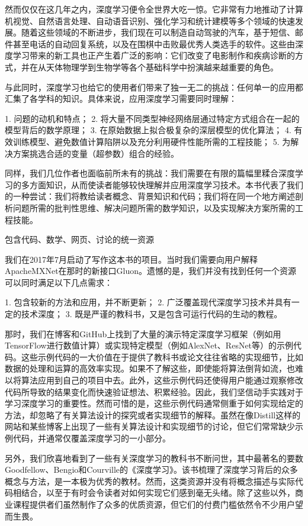 然而仅仅在这几年之内，深度学习便令全世界大吃一惊。它非常有力地推动了计算机视觉、自然语言处理、自动语音识别、强化学习和统计建模等多个领域的快速发展。随着这些领域的不断进步，我们现在可以制造自动驾驶的汽车，基于短信、邮件甚至电话的自动回复系统，以及在围棋中击败最优秀人类选手的软件。这些由深度学习带来的新工具也正产生着广泛的影响：它们改变了电影制作和疾病诊断的方式，并在从天体物理学到生物学等各个基础科学中扮演越来越重要的角色。

与此同时，深度学习也给它的使用者们带来了独一无二的挑战：任何单一的应用都汇集了各学科的知识。具体来说，应用深度学习需要同时理解：

1. 问题的动机和特点；
2. 将大量不同类型神经网络层通过特定方式组合在一起的模型背后的数学原理；
3. 在原始数据上拟合极复杂的深层模型的优化算法；
4. 有效训练模型、避免数值计算陷阱以及充分利用硬件性能所需的工程技能；
5. 为解决方案挑选合适的变量（超参数）组合的经验。

同样，我们几位作者也面临前所未有的挑战：我们需要在有限的篇幅里糅合深度学习的多方面知识，从而使读者能够较快理解并应用深度学习技术。本书代表了我们的一种尝试：我们将教给读者概念、背景知识和代码；我们将在同一个地方阐述剖析问题所需的批判性思维、解决问题所需的数学知识，以及实现解决方案所需的工程技能。

 包含代码、数学、网页、讨论的统一资源

我们在2017年7月启动了写作这本书的项目。当时我们需要向用户解释ApacheMXNet在那时的新接口Gluon。遗憾的是，我们并没有找到任何一个资源可以同时满足以下几点需求：

1. 包含较新的方法和应用，并不断更新；
2. 广泛覆盖现代深度学习技术并具有一定的技术深度；
3. 既是严谨的教科书，又是包含可运行代码的生动的教程。

那时，我们在博客和GitHub上找到了大量的演示特定深度学习框架（例如用TensorFlow进行数值计算）或实现特定模型（例如AlexNet、ResNet等）的示例代码。这些示例代码的一大价值在于提供了教科书或论文往往省略的实现细节，比如数据的处理和运算的高效率实现。如果不了解这些，即使能将算法倒背如流，也难以将算法应用到自己的项目中去。此外，这些示例代码还使得用户能通过观察修改代码所导致的结果变化而快速验证想法、积累经验。因此，我们坚信动手实践对于学习深度学习的重要性。然而可惜的是，这些示例代码通常侧重于如何实现给定的方法，却忽略了有关算法设计的探究或者实现细节的解释。虽然在像Distill这样的网站和某些博客上出现了一些有关算法设计和实现细节的讨论，但它们常常缺少示例代码，并通常仅覆盖深度学习的一小部分。

另外，我们欣喜地看到了一些有关深度学习的教科书不断问世，其中最著名的要数Goodfellow、Bengio和Courville的《深度学习》。该书梳理了深度学习背后的众多概念与方法，是一本极为优秀的教材。然而，这类资源并没有将概念描述与实际代码相结合，以至于有时会令读者对如何实现它们感到毫无头绪。除了这些以外，商业课程提供者们虽然制作了众多的优质资源，但它们的付费门槛依然令不少用户望而生畏。

